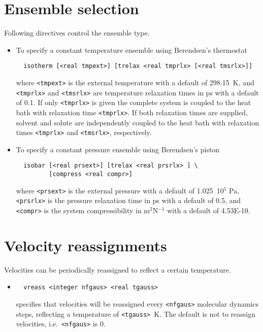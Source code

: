 \section{Ensemble selection}
Following directives control the ensemble type.
\begin{itemize}
\item
To specify a constant temperature ensemble using Berendsen's thermostat
\begin{verbatim}
  isotherm [<real tmpext>] [trelax <real tmprlx> [<real tmsrlx>]]
\end{verbatim}
where \verb+<tmpext>+ is the external temperature with a default of 298.15~K,
and \verb+<tmprlx>+ and \verb+<tmsrlx>+ are temperature relaxation times in ps 
with a default of 0.1. If only \verb+<tmprlx>+ is given the complete system
is coupled to the heat bath with relaxation time \verb+<tmprlx>+. If both
relaxation times are supplied, solvent and solute are independently coupled
to the heat bath with relaxation times \verb+<tmprlx>+ and \verb+<tmsrlx>+,
respectively.
\item
To specify a constant pressure ensemble using Berendsen's piston
\begin{verbatim}
  isobar [<real prsext>] [trelax <real prsrlx> ] \
         [compress <real compr>]
\end{verbatim}
where \verb+<prsext>+ is the external pressure with a default of 1.025~10$^5$ Pa,
\verb+<prsrlx>+ is the pressure relaxation time in ps with a default of 0.5, and
\verb+<compr>+ is the system compressibility in m$^2$N$^{-1}$ with a
default of 4.53E-10.
\end{itemize}

\section{Velocity reassignments}
Velocities can be periodically reassigned to reflect a certain temperature.
\begin{itemize}
\item
\begin{verbatim}
  vreass <integer nfgaus> <real tgauss>
\end{verbatim}
specifies that velocities will be reassigned every \verb+<nfgaus>+ molecular
dynamics steps, reflecting a temperature of \verb+<tgauss>+~K. The default
is not to reassign velocities, i.e.\ \verb+<nfgaus>+ is 0.
\end{itemize}

